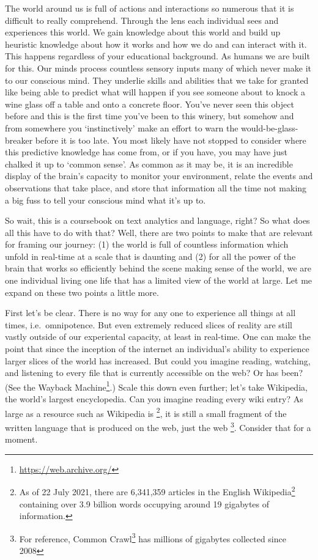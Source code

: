 \documentclass[
]{article}
\DeclareRobustCommand{\href}[2]{#2\footnote{\url{#1}}}
\begin{document}
The world around us is full of actions and interactions so numerous that it is difficult to really comprehend. Through the lens each individual sees and experiences this world. We gain knowledge about this world and build up heuristic knowledge about how it works and how we do and can interact with it. This happens regardless of your educational background. As humans we are built for this. Our minds process countless sensory inputs many of which never make it to our conscious mind. They underlie skills and abilities that we take for granted like being able to predict what will happen if you see someone about to knock a wine glass off a table and onto a concrete floor. You've never seen this object before and this is the first time you've been to this winery, but somehow and from somewhere you `instinctively' make an effort to warn the would-be-glass-breaker before it is too late. You most likely have not stopped to consider where this predictive knowledge has come from, or if you have, you may have just chalked it up to `common sense'. As common as it may be, it is an incredible display of the brain's capacity to monitor your environment, relate the events and observations that take place, and store that information all the time not making a big fuss to tell your conscious mind what it's up to.

So wait, this is a coursebook on text analytics and language, right? So what does all this have to do with that? Well, there are two points to make that are relevant for framing our journey: (1) the world is full of countless information which unfold in real-time at a scale that is daunting and (2) for all the power of the brain that works so efficiently behind the scene making sense of the world, we are one individual living one life that has a limited view of the world at large. Let me expand on these two points a little more.

First let's be clear. There is no way for any one to experience all things at all times, i.e.~omnipotence. But even extremely reduced slices of reality are still vastly outside of our experiental capacity, at least in real-time. One can make the point that since the inception of the internet an individual's ability to experience larger slices of the world has increased. But could you imagine reading, watching, and listening to every file that is currently accessible on the web? Or has been? (See the \href{https://web.archive.org/}{Wayback Machine}.) Scale this down even further; let's take Wikipedia, the world's largest encyclopedia. Can you imagine reading every wiki entry? As large as a resource such as Wikipedia is \footnote{As of 22 July 2021, there are 6,341,359 articles in the \href{https://en.wikipedia.org/wiki/English_Wikipedia}{English Wikipedia} containing over 3.9 billion words occupying around 19 gigabytes of information.}, it is still a small fragment of the written language that is produced on the web, just the web \footnote{For reference, \href{https://commoncrawl.org/big-picture/}{Common Crawl} has millions of gigabytes collected since 2008}. Consider that for a moment.
\end{document}
